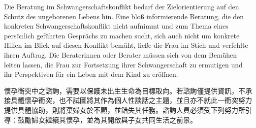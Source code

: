 \documentclass[12pt]{article}
\begin{document}
\begin{sourcepara}[title={原文D.109}]
Die Beratung im Schwangerschaftskonflikt bedarf der Zielorientierung auf den Schutz des ungeborenen Lebens hin. Eine bloß informierende Beratung, die den konkreten Schwangerschaftskonflikt nicht aufnimmt und zum Thema eines persönlich geführten Gesprächs zu machen sucht, sich auch nicht um konkrete Hilfen im Blick auf diesen Konflikt bemüht, ließe die Frau im Stich und verfehlte ihren Auftrag. Die Beraterinnen oder Berater müssen sich von dem Bemühen leiten lassen, die Frau zur Fortsetzung ihrer Schwangerschaft zu ermutigen und ihr Perspektiven für ein Leben mit dem Kind zu eröffnen.
\end{sourcepara}
\begin{transpara}
懷孕衝突中之諮詢，需要以保護未出生生命為目標取向。若諮詢僅提供資訊，不承接具體懷孕衝突，也不試圖將其作為個人性談話之主題，並且亦不就此一衝突努力提供具體協助，則將棄婦女於不顧，並錯失其任務。諮詢人員必須受下列努力所引導：鼓勵婦女繼續其懷孕，並為其開啟與子女共同生活之前景。
\end{transpara}
\end{document}
